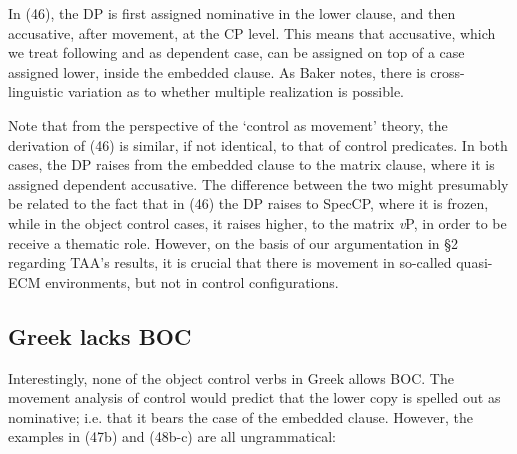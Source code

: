 \documentclass[output=paper]{langsci/langscibook}
\begin{document}
In (46), the DP is first assigned nominative in the lower clause, and then accusative, after movement, at the CP level. This means that accusative, which we treat following \citet{Marantz1991} and \citet{Baker2015} as dependent case, can be assigned on top of a case assigned lower, inside the embedded clause. As Baker notes, there is cross-linguistic variation as to whether multiple realization is possible. 

Note that from the perspective of the ‘control as movement’ theory, the derivation of (46) is similar, if not identical, to that of control predicates. In both cases, the DP raises from the embedded clause to the matrix clause, where it is assigned dependent accusative. The difference between the two might presumably be related to the fact that in (46) the DP raises to SpecCP, where it is frozen, while in the object control cases, it raises higher, to the matrix \textit{v}P, in order to be receive a thematic role. However, on the basis of our argumentation in §2 regarding TAA’s results, it is crucial that there is movement in so-called quasi-ECM environments, but not in control configurations. 

\subsection{Greek lacks BOC}%

Interestingly, none of the object control verbs in Greek allows BOC. The movement analysis of control would predict that the lower copy is spelled out as nominative; i.e. that it bears the case of the embedded clause. However, the examples in (47b) and (48b-c) are all ungrammatical:



\ea%
    \label{ex:alexiadou:47}
    \z
\z    
\end{document}
